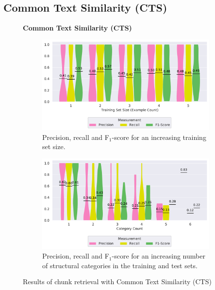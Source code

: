 \subsection{Common Text Similarity (CTS)}
\label{sec:r:cts}
\begin{figure}
\centering
    \textbf{Common Text Similarity (CTS)}\par\medskip
\begin{subfigure}[t]{\columnwidth}
		\centering
		\includegraphics[width=\columnwidth,
		clip]{img/big-study/recall-precision-examplecount-CTS.pdf}
		\caption{Precision, recall and F$_{1}$-score for an
		increasing training set size.}
		\label{fig:recall-precision-examplecount-CTS}

\end{subfigure}\hspace{\fill}
\begin{subfigure}[t]{\columnwidth}
		\centering
				\includegraphics[width=\columnwidth,
				clip]{img/big-study/recall-precision-categorycount-CTS.pdf}
		\caption{Precision, recall and F$_{1}$-score for
		an increasing number of structural categories in the
		training and test sets.}
		\label{fig:recall-precision-categorycount-CTS}
\end{subfigure}
\caption{Results of chunk retrieval with Common Text Similarity (CTS)}
\end{figure}

